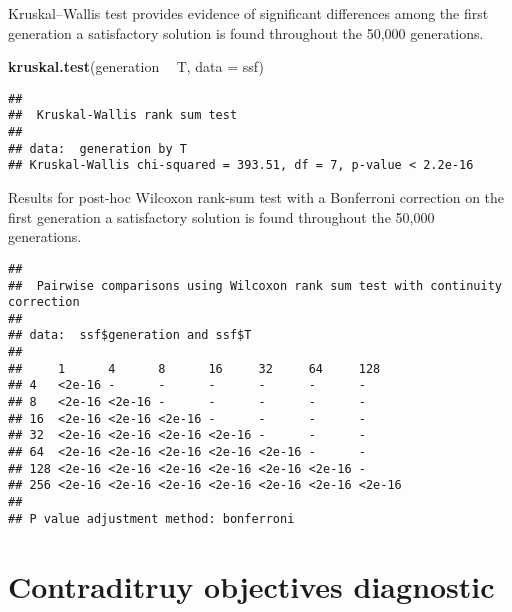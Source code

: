 \documentclass[]{book}
\newenvironment{Shaded}{\begin{snugshade}}{\end{snugshade}}
\newcommand{\DataTypeTok}[1]{\textcolor[rgb]{0.13,0.29,0.53}{#1}}
\newcommand{\KeywordTok}[1]{\textcolor[rgb]{0.13,0.29,0.53}{\textbf{#1}}}
\newcommand{\NormalTok}[1]{#1}
\newcommand{\OperatorTok}[1]{\textcolor[rgb]{0.81,0.36,0.00}{\textbf{#1}}}
\newcommand{\OtherTok}[1]{\textcolor[rgb]{0.56,0.35,0.01}{#1}}
\newcommand{\StringTok}[1]{\textcolor[rgb]{0.31,0.60,0.02}{#1}}
\begin{document}
Kruskal--Wallis test provides evidence of significant differences among the first generation a satisfactory solution is found throughout the 50,000 generations.

\begin{Shaded}
\begin{Highlighting}[]
\KeywordTok{kruskal.test}\NormalTok{(generation }\OperatorTok{~}\StringTok{ }\NormalTok{T, }\DataTypeTok{data =}\NormalTok{ ssf)}
\end{Highlighting}
\end{Shaded}

\begin{verbatim}
## 
##  Kruskal-Wallis rank sum test
## 
## data:  generation by T
## Kruskal-Wallis chi-squared = 393.51, df = 7, p-value < 2.2e-16
\end{verbatim}

Results for post-hoc Wilcoxon rank-sum test with a Bonferroni correction on the first generation a satisfactory solution is found throughout the 50,000 generations.

\begin{Shaded}
\end{Shaded}

\begin{verbatim}
## 
##  Pairwise comparisons using Wilcoxon rank sum test with continuity correction 
## 
## data:  ssf$generation and ssf$T 
## 
##     1      4      8      16     32     64     128   
## 4   <2e-16 -      -      -      -      -      -     
## 8   <2e-16 <2e-16 -      -      -      -      -     
## 16  <2e-16 <2e-16 <2e-16 -      -      -      -     
## 32  <2e-16 <2e-16 <2e-16 <2e-16 -      -      -     
## 64  <2e-16 <2e-16 <2e-16 <2e-16 <2e-16 -      -     
## 128 <2e-16 <2e-16 <2e-16 <2e-16 <2e-16 <2e-16 -     
## 256 <2e-16 <2e-16 <2e-16 <2e-16 <2e-16 <2e-16 <2e-16
## 
## P value adjustment method: bonferroni
\end{verbatim}

\hypertarget{contraditruy-objectives-diagnostic}{%
\section{Contraditruy objectives diagnostic}\label{contraditruy-objectives-diagnostic}}
\end{document}
